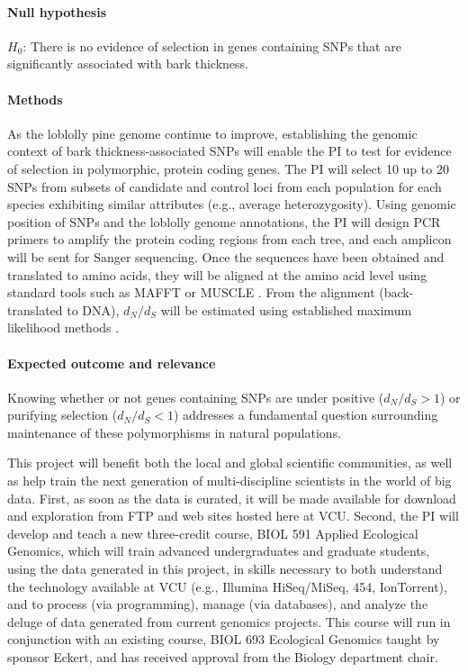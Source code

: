 \paragraph{Null hypothesis} $H_0$: There is no evidence of selection in genes containing SNPs that are significantly associated 
with bark thickness.

\paragraph{Methods} As the loblolly pine genome continue to improve, establishing the genomic context of 
bark thickness-associated SNPs will enable the PI to test for evidence of selection in polymorphic, protein coding genes.  
The PI will select 10 up to 20 SNPs from subsets of candidate and control loci from each population for each species 
exhibiting similar attributes (e.g., average heterozygosity).   Using genomic position of SNPs and the loblolly genome 
annotations, the PI will design PCR primers to amplify the protein coding regions from each tree, and each amplicon will 
be sent for Sanger sequencing.  Once the sequences have been obtained and translated to amino acids, they will be 
aligned at the amino acid level using standard tools such as MAFFT \citep{Katoh:2005ia} or MUSCLE \citep{Edgar:2004ic}.  
From the alignment (back-translated to DNA), $d_N/d_S$ will be estimated using established maximum likelihood methods 
\citep{Yang:2007ki}.

\paragraph{Expected outcome and relevance}  Knowing whether or not genes containing SNPs are under positive ($d_N/d_S > 1$) or 
purifying selection ($d_N/d_S < 1$) addresses a fundamental question surrounding maintenance of these polymorphisms in 
natural populations.

This project will benefit both the local and global scientific communities, as well as help train 
the next generation of multi-discipline scientists in the world of big data.  First, as soon as the data is curated, it will be made 
available for download and exploration from FTP and web sites hosted here at VCU.  Second, the PI will develop and teach a new 
three-credit course, BIOL 591 Applied Ecological Genomics, which will train advanced undergraduates and 
graduate students, using the data generated in this project, in skills necessary to both understand the 
technology available at VCU (e.g., Illumina HiSeq/MiSeq, 454, IonTorrent), and to 
process (via programming), manage (via databases), and analyze the deluge of data generated from current genomics 
projects.  This course will run in conjunction with an existing course, BIOL 693 Ecological Genomics taught by sponsor Eckert, 
and has received approval from the Biology department chair.


